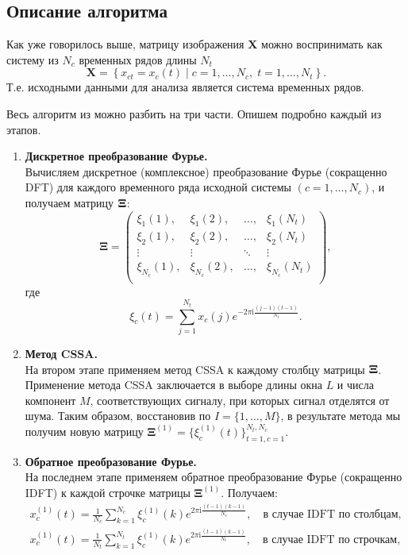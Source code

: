 \documentclass[specialist,
               substylefile = spbu.rtx,
               subf,href,colorlinks=true, 12pt]{disser}
\newcommand{\I}{\mathrm{i}}
\begin{document}
\subsection{Описание алгоритма}
\label{sec:use_cssa_algorithm}
Как уже говорилось выше, матрицу изображения $\mathbf{X}$ можно воспринимать как систему из $N_c$ временных рядов длины $N_t$
\begin{equation*}
	\mathbf{X}=\left\{x_{ct}=x_c(t) \; | \; c=1, \ldots, N_c, \; t=1, \ldots, N_t\right\}.
\end{equation*}
Т.е. исходными данными для анализа является система временных рядов.

    Весь алгоритм из \cite{Trickett2003} можно разбить на три части.
    Опишем подробно каждый из этапов.

\begin{enumerate}
\item
{\bf Дискретное преобразование Фурье.\\}
    Вычисляем дискретное (комплексное) преобразование Фурье (сокращенно DFT)
    для каждого временного ряда исходной системы $(c=1, \ldots, N_c)$,
    и получаем матрицу $\bf\Xi$:
\begin{equation*}
\mathbf\Xi =
\left(
\begin{array}{cccc}
    \xi_1(1), & \xi_1(2), & \ldots, & \xi_1(N_t)\\
    \xi_2(1), & \xi_2(2), & \ldots, & \xi_2(N_t)\\
    \vdots & \vdots & \ddots & \vdots\\
    \xi_{N_c}(1), & \xi_{N_c}(2), & \ldots, & \xi_{N_c}(N_t)\\
\end{array}
\right),
\end{equation*}
   где
\begin{equation*}
    \xi_c(t) = \sum_{j=1}^{N_t}x_c(j)e^{-2\pi \I \frac{(j-1)(t-1)}{N_t}}.
\end{equation*}

\item
{\bf Метод CSSA.\\}
На втором этапе применяем метод CSSA
 к каждому столбцу матрицы $\bf\Xi$.
Применение метода CSSA заключается в выборе длины окна $L$ и числа компонент $M$, соответствующих сигналу,  при которых сигнал отделятся от шума.
Таким образом, восстановив по $I = \{1,\ldots,M\}$, в результате метода мы получим новую матрицу $\mathbf{\Xi}^{(1)} = \{\xi^{(1)}_c(t)\}_{t=1, c=1}^{N_t, N_c}$.

\item
{\bf Обратное преобразование Фурье.\\}
На последнем этапе применяем обратное преобразование Фурье (сокращенно IDFT)
к каждой строчке матрицы $\mathbf{\Xi}^{(1)}$.
Получаем:
\begin{gather*}
     x_c^{(1)}(t) = \frac{1}{N_c}\sum_{k=1}^{N_c}\xi_c^{(1)}(k)e^{2\pi \I \frac{(t-1)(k-1)}{N_c}},
    \quad \text{в случае IDFT по столбцам}, \\
     x_c^{(1)}(t) = \frac{1}{N_t}\sum_{k=1}^{N_t}\xi_c^{(1)}(k)e^{2\pi \I \frac{(t-1)(k-1)}{N_t}},
    \quad \text{в случае IDFT по строчкам},
\end{gather*}


\end{enumerate}
\end{document}
